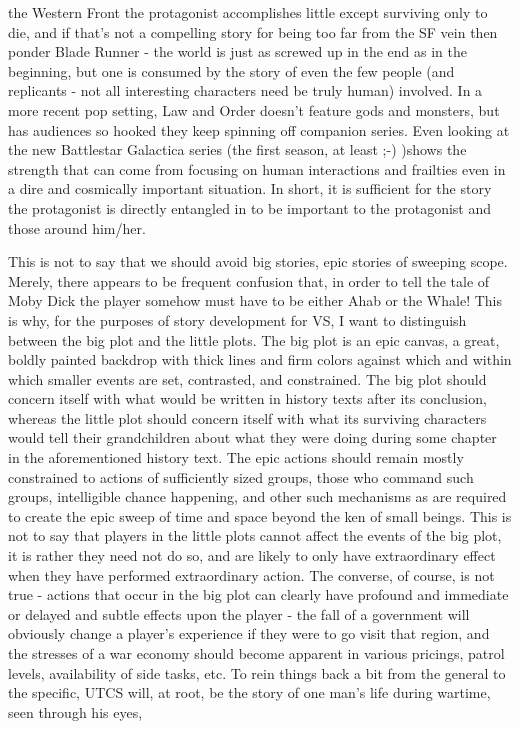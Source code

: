 the Western Front the protagonist accomplishes little except surviving
only to die, and if that's not a compelling story for being too far
from the SF vein then ponder Blade Runner - the world is just as
screwed up in the end as in the beginning, but one is consumed by the
story of even the few people (and replicants - not all interesting
characters need be truly human) involved. In a more recent pop
setting, Law and Order doesn't feature gods and monsters, but has
audiences so hooked they keep spinning off companion series. Even
looking at the new Battlestar Galactica series (the first season, at
least ;-) )shows the strength that can come from focusing on human
interactions and frailties even in a dire and cosmically important
situation. In short, it is sufficient for the story the protagonist is
directly entangled in to be important to the protagonist and those
around him/her.

This is not to say that we should avoid big stories, epic stories of
sweeping scope. Merely, there appears to be frequent confusion that,
in order to tell the tale of Moby Dick the player somehow must have to
be either Ahab or the Whale! This is why, for the purposes of story
development for VS, I want to distinguish between the big plot and the
little plots. The big plot is an epic canvas, a great, boldly painted
backdrop with thick lines and firm colors against which and within
which smaller events are set, contrasted, and constrained. The big
plot should concern itself with what would be written in history texts
after its conclusion, whereas the little plot should concern itself
with what its surviving characters would tell their grandchildren
about what they were doing during some chapter in the aforementioned
history text. The epic actions should remain mostly constrained to
actions of sufficiently sized groups, those who command such groups,
intelligible chance happening, and other such mechanisms as are
required to create the epic sweep of time and space beyond the ken of
small beings. This is not to say that players in the little plots
cannot affect the events of the big plot, it is rather they need not
do so, and are likely to only have extraordinary effect when they have
performed extraordinary action. The converse, of course, is not true -
actions that occur in the big plot can clearly have profound and
immediate or delayed and subtle effects upon the player - the fall of
a government will obviously change a player's experience if they were
to go visit that region, and the stresses of a war economy should
become apparent in various pricings, patrol levels, availability of
side tasks, etc. To rein things back a bit from the general to the
specific, UTCS will, at root, be the story of one man's life during
wartime, seen through his eyes,

